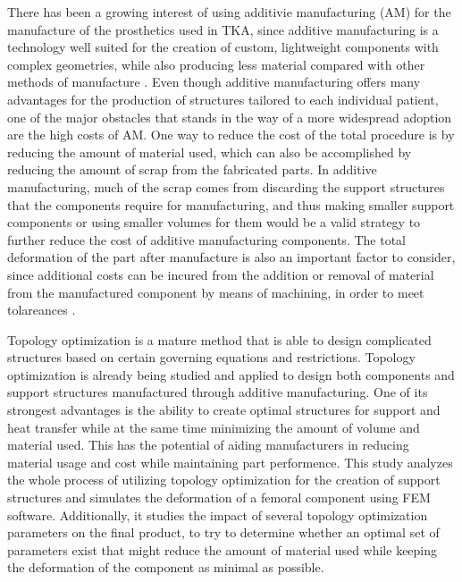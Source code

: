 \documentclass[../main.tex]{subfiles}
\begin{document}
There has been a growing interest of using additivie manufacturing (AM) for the manufacture of the prosthetics used in TKA, since additive manufacturing is a technology well suited for the creation of custom, lightweight components with complex geometries, while also producing less material compared with other methods of manufacture \cite{narraAdditiveManufacturingTotal2019}. Even though additive manufacturing offers many advantages for the production of structures tailored to each individual patient, one of the major obstacles that stands in the way of a more widespread adoption are the high costs of AM. One way to reduce the cost of the total procedure is by reducing the amount of material used, which can also be accomplished by reducing the amount of scrap from the fabricated parts.  In additive manufacturing, much of the scrap comes from discarding the support structures that the components require for manufacturing, and thus making smaller support components or using smaller volumes for them would be a valid strategy to further reduce the cost of additive manufacturing components. The total deformation of the part after manufacture is also an important factor to consider, since additional costs can be incured from the addition or removal of material from the manufactured component by means of machining, in order to meet tolareances \cite{narraAdditiveManufacturingTotal2019}. 

Topology optimization is a mature method that is able to design complicated structures based on certain governing equations and restrictions. Topology optimization is already being studied and applied to design both components and support structures manufactured through additive manufacturing. One of its strongest advantages is the ability to create optimal structures for support and heat transfer while at the same time minimizing the amount of volume and material used. This has the potential of aiding manufacturers in reducing material usage and cost while maintaining part performence. This study analyzes the whole process of utilizing topology optimization for the creation of support structures and simulates the deformation of a femoral component using FEM software. Additionally, it studies the impact of several topology optimization parameters on the final product, to try to determine whether an optimal set of parameters exist that might reduce the amount of material used while keeping the deformation of the component as minimal as possible.
\end{document}
